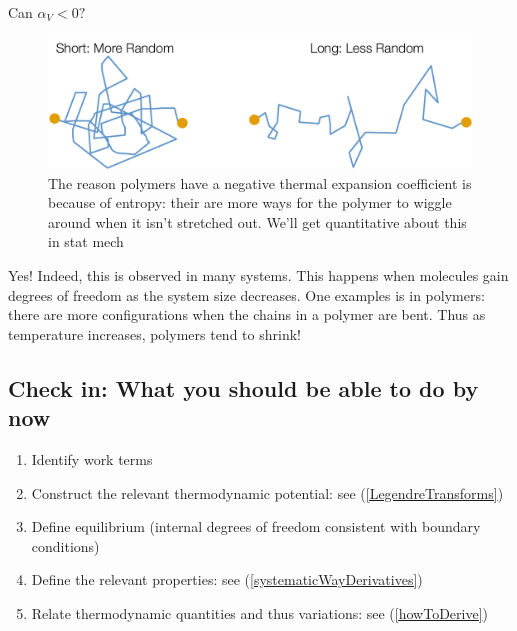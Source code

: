 \documentclass[12pt]{article}
\begin{document}
Can $\alpha_V < 0?$
\begin{figure}[h]
\centering
\includegraphics[width=\textwidth]{Short_and_Long_Comparison}
\caption{The reason polymers have a negative thermal expansion coefficient is because of entropy: their are more ways for the polymer to wiggle around when it isn't stretched out. We'll get quantitative about this in stat mech}
\label{shortLongEntropy}
\end{figure}
Yes! Indeed, this is observed in many systems. This happens when molecules gain degrees of freedom as the system size decreases. One examples is in polymers: there are more configurations when the chains in a polymer are bent. Thus as temperature increases, polymers tend to shrink!


\subsection{Check in: What you should be able to do by now}

\begin{enumerate}[(1)]
\item Identify work terms
\item Construct the relevant thermodynamic potential: see (\ref{LegendreTransforms})
\item Define equilibrium (internal degrees of freedom consistent with boundary conditions) 
\item Define the relevant properties: see (\ref{systematicWayDerivatives})
\item Relate thermodynamic quantities and thus variations: see (\ref{howToDerive})
\end{enumerate}
\end{document}

